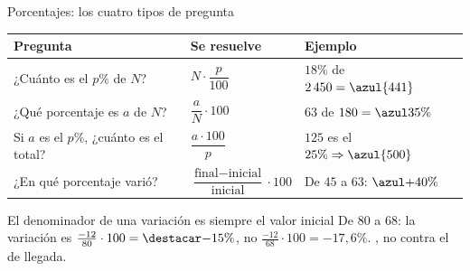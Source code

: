 \documentclass[aspectratio=169,10pt]{beamer}
\begin{document}
\begin{frame}{Porcentajes: los cuatro tipos de pregunta}
  \scriptsize
  \begin{center}
  \begin{tabular}{@{}p{3.6cm}p{4.0cm}p{4.2cm}@{}}
    \toprule
    \textbf{Pregunta} & \textbf{Se resuelve} & \textbf{Ejemplo} \\
    \midrule
    ¿Cuánto es el $p\%$ de $N$? &
      $N\cdot\dfrac{p}{100}$ &
      $18\%$ de $2\,450 = \azul{441}$ \\
    \addlinespace
    ¿Qué porcentaje es $a$ de $N$? &
      $\dfrac{a}{N}\cdot 100$ &
      $63$ de $180 = \azul{35\%}$ \\
    \addlinespace
    Si $a$ es el $p\%$, ¿cuánto es el total? &
      $\dfrac{a\cdot 100}{p}$ &
      $125$ es el $25\% \Rightarrow \azul{500}$ \\
    \addlinespace
    ¿En qué porcentaje varió? &
      $\dfrac{\text{final}-\text{inicial}}{\text{inicial}}\cdot 100$ &
      De $45$ a $63$: $\azul{+40\%}$ \\
    \bottomrule
  \end{tabular}
  \end{center}

  \vspace{0.1cm}
  \begin{alertblock}{El denominador de una variación es siempre el valor inicial}
    \tiny
    De $80$ a $68$: la variación es $\tfrac{-12}{80}\cdot 100
    = \destacar{-15\%}$, no $\tfrac{-12}{68}\cdot 100 = -17{,}6\%$.
    , no contra el de llegada.
  \end{alertblock}
\end{frame}
\end{document}
